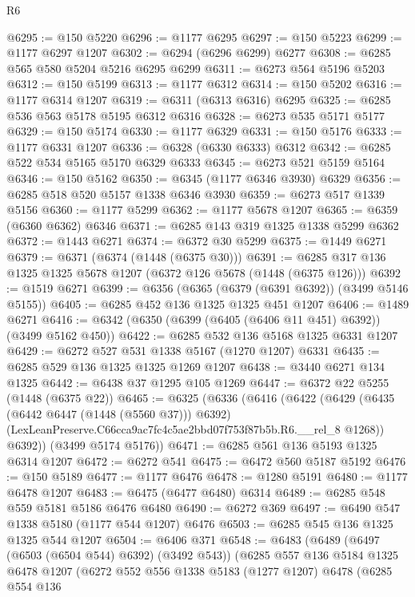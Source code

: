 \begin{lexlean}{R6}
\begin{coremodule}
@6295 := @150 @5220
@6296 := @1177 @6295
@6297 := @150 @5223
@6299 := @1177 @6297 @1207
@6302 := @6294 (@6296 @6299) @6277
@6308 := @6285 @565 @580 @5204 @5216 @6295 @6299
@6311 := @6273 @564 @5196 @5203
@6312 := @150 @5199
@6313 := @1177 @6312
@6314 := @150 @5202
@6316 := @1177 @6314 @1207
@6319 := @6311 (@6313 @6316) @6295
@6325 := @6285 @536 @563 @5178 @5195 @6312 @6316
@6328 := @6273 @535 @5171 @5177
@6329 := @150 @5174
@6330 := @1177 @6329
@6331 := @150 @5176
@6333 := @1177 @6331 @1207
@6336 := @6328 (@6330 @6333) @6312
@6342 := @6285 @522 @534 @5165 @5170 @6329 @6333
@6345 := @6273 @521 @5159 @5164
@6346 := @150 @5162
@6350 := @6345 (@1177 @6346 @3930) @6329
@6356 := @6285 @518 @520 @5157 @1338 @6346 @3930
@6359 := @6273 @517 @1339 @5156
@6360 := @1177 @5299
@6362 := @1177 @5678 @1207
@6365 := @6359 (@6360 @6362) @6346
@6371 := @6285 @143 @319 @1325 @1338 @5299 @6362
@6372 := @1443 @6271
@6374 := @6372 @30 @5299
@6375 := @1449 @6271
@6379 := @6371 (@6374 (@1448 (@6375 @30)))
@6391 := @6285 @317 @136 @1325 @1325 @5678 @1207 (@6372 @126 @5678 (@1448 (@6375 @126)))
@6392 := @1519 @6271
@6399 := @6356 (@6365 (@6379 (@6391 @6392)) (@3499 @5146 @5155))
@6405 := @6285 @452 @136 @1325 @1325 @451 @1207
@6406 := @1489 @6271
@6416 := @6342 (@6350 (@6399 (@6405 (@6406 @11 @451) @6392)) (@3499 @5162 @450))
@6422 := @6285 @532 @136 @5168 @1325 @6331 @1207
@6429 := @6272 @527 @531 @1338 @5167 (@1270 @1207) @6331
@6435 := @6285 @529 @136 @1325 @1325 @1269 @1207
@6438 := @3440 @6271 @134 @1325
@6442 := @6438 @37 @1295 @105 @1269
@6447 := @6372 @22 @5255 (@1448 (@6375 @22))
@6465 := @6325
    (@6336
      (@6416
        (@6422
          (@6429
            (@6435 (@6442 @6447 (@1448 (@5560 @37))) @6392)
            (LexLeanPreserve.C66cca9ac7fc4c5ae2bbd07f753f87b5b.R6.__rel_8 @1268))
          @6392))
      (@3499 @5174 @5176))
@6471 := @6285 @561 @136 @5193 @1325 @6314 @1207
@6472 := @6272 @541
@6475 := @6472 @560 @5187 @5192
@6476 := @150 @5189
@6477 := @1177 @6476
@6478 := @1280 @5191
@6480 := @1177 @6478 @1207
@6483 := @6475 (@6477 @6480) @6314
@6489 := @6285 @548 @559 @5181 @5186 @6476 @6480
@6490 := @6272 @369
@6497 := @6490 @547 @1338 @5180 (@1177 @544 @1207) @6476
@6503 := @6285 @545 @136 @1325 @1325 @544 @1207
@6504 := @6406 @371
@6548 := @6483
    (@6489
      (@6497 (@6503 (@6504 @544) @6392) (@3492 @543))
      (@6285
        @557
        @136
        @5184
        @1325
        @6478
        @1207
        (@6272
          @552
          @556
          @1338
          @5183
          (@1277 @1207)
          @6478
          (@6285
            @554
            @136

\end{coremodule}
\end{lexlean}
